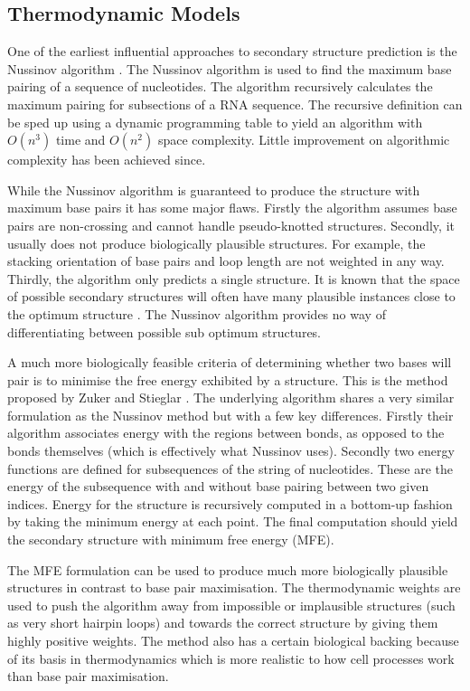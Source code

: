 \documentclass[journal]{IEEEtran}
\begin{document}
\subsection{Thermodynamic Models}
\label{subsec:thermodynamic-models}

One of the earliest influential approaches to secondary structure prediction is the Nussinov algorithm \cite{nussinov1980fast}. The Nussinov algorithm is used to find the maximum base pairing of a sequence of nucleotides. The algorithm recursively calculates the maximum pairing for subsections of a RNA sequence. The recursive definition can be sped up using a dynamic programming table to yield an algorithm with $O(n^3)$ time and $O(n^2)$ space complexity. Little improvement on algorithmic complexity has been achieved since. 

While the Nussinov algorithm is guaranteed to produce the structure with maximum base pairs it has some major flaws. Firstly the algorithm assumes base pairs are non-crossing and cannot handle pseudo-knotted structures. Secondly, it usually does not produce biologically plausible structures. For example, the stacking orientation of base pairs and loop length are not weighted in any way. Thirdly, the algorithm only predicts a single structure. It is known that the space of possible secondary structures will often have many plausible instances close to the optimum structure \cite{mccaskill1990equilibrium}. The Nussinov algorithm provides no way of differentiating between possible sub optimum structures. 

A much more biologically feasible criteria of determining whether two bases will pair is to minimise the free energy exhibited by a structure. This is the method proposed by Zuker and Stieglar \cite{zuker1981optimal}. The underlying algorithm shares a very similar formulation as the Nussinov method but with a few key differences. Firstly their algorithm associates energy with the regions between bonds, as opposed to the bonds themselves (which is effectively what Nussinov uses). Secondly two energy functions are defined for subsequences of the string of nucleotides. These are the energy of the subsequence with and without base pairing between two given indices. Energy for the structure is recursively computed in a bottom-up fashion by taking the minimum energy at each point. The final computation should yield the secondary structure with minimum free energy (MFE).

The MFE formulation can be used to produce much more biologically plausible structures in contrast to base pair maximisation. The thermodynamic weights are used to push the algorithm away from impossible or implausible structures (such as very short hairpin loops) and towards the correct structure by giving them highly positive weights. The method also has a certain biological backing because of its basis in thermodynamics which is more realistic to how cell processes work than base pair maximisation. 
\end{document}
